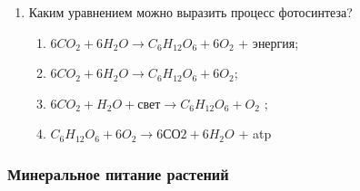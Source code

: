 \begin{enumerate}
\item Каким уравнением можно выразить процесс фотосинтеза?
\begin{enumerate}
	\item $6CO_{2} + 6H_{2}O   \rightarrow  C_{6}H_{12}O_{6} + 6O_{2}$ + энергия;
	\item $6CO_{2} + 6H_{2}O   \rightarrow  C_{6}H_{12}O_{6} + 6O_{2}$;
	\item $6CO_{2} + H_{2}O + свет \rightarrow   C_{6}H_{12}O_{6} + O_{2}$ ;
	\item $C_{6}H_{12}O_{6}  + 6O_{2}  → 6СО2  + 6H_{2}O$ + \gls{atp}
\end{enumerate}

\end{enumerate}


\subsubsection*{Минеральное питание растений}

